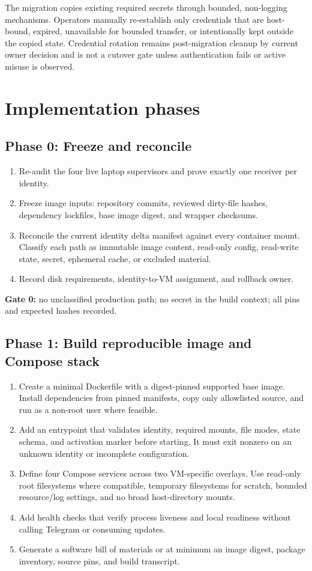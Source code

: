 \documentclass[11pt]{article}
\begin{document}
The migration copies existing required secrets through bounded, non-logging
mechanisms. Operators manually re-establish only credentials that are
host-bound, expired, unavailable for bounded transfer, or intentionally kept
outside the copied state. Credential rotation remains post-migration cleanup by
current owner decision and is not a cutover gate unless authentication fails or
active misuse is observed.

\section{Implementation phases}

\subsection*{Phase 0: Freeze and reconcile}
\begin{enumerate}
\item Re-audit the four live laptop supervisors and prove exactly one receiver
per identity.
\item Freeze image inputs: repository commits, reviewed dirty-file hashes,
dependency lockfiles, base image digest, and wrapper checksums.
\item Reconcile the current identity delta manifest against every container
mount. Classify each path as immutable image content, read-only config,
read-write state, secret, ephemeral cache, or excluded material.
\item Record disk requirements, identity-to-VM assignment, and rollback owner.
\end{enumerate}

\textbf{Gate 0:} no unclassified production path; no secret in the build
context; all pins and expected hashes recorded.

\subsection*{Phase 1: Build reproducible image and Compose stack}
\begin{enumerate}
\item Create a minimal Dockerfile with a digest-pinned supported base image.
Install dependencies from pinned manifests, copy only allowlisted source, and
run as a non-root user where feasible.
\item Add an entrypoint that validates identity, required mounts, file modes,
state schema, and activation marker before starting. It must exit nonzero on an
unknown identity or incomplete configuration.
\item Define four Compose services across two VM-specific overlays. Use
read-only root filesystems where compatible, temporary filesystems for scratch,
bounded resource/log settings, and no broad host-directory mounts.
\item Add health checks that verify process liveness and local readiness without
calling Telegram or consuming updates.
\item Generate a software bill of materials or at minimum an image digest,
package inventory, source pins, and build transcript.
\end{enumerate}
\end{document}
